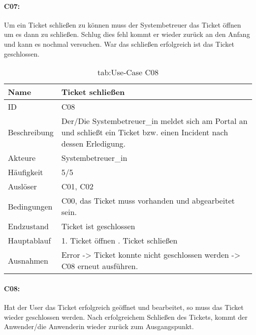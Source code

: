 \paragraph{C07:}
Um ein Ticket schließen zu können muss der Systembetreuer das Ticket öffnen um es dann zu schließen. Schlug dies fehl kommt er wieder zurück an den Anfang und kann es nochmal versuchen. War das schließen erfolgreich ist das Ticket geschlossen.

\newpage
\begin{table}[h]
	\begin{tabular}{|p{3cm}|p{10.7cm}|}
		\hline
		Name & Ticket schließen\\
		\hline
		ID &  C08\\
		\hline
		Beschreibung & Der/Die Systembetreuer\_in meldet sich am Portal an und schließt ein Ticket bzw. einen Incident nach dessen Erledigung.\\
		\hline
		Akteure & Systembetreuer\_in\\
		\hline
		Häufigkeit & 5/5\\
		\hline
		Auslöser & C01, C02\\
		\hline
		Bedingungen & C00, das Ticket muss vorhanden und abgearbeitet sein.\\
		\hline
		Endzustand & Ticket ist geschlossen\\
		\hline
		Hauptablauf & 1. Ticket öffnen \newline2. Ticket schließen\\
		\hline
		Ausnahmen & Error -> Ticket konnte nicht geschlossen werden -> C08 erneut ausführen.\\
		\hline
	\end{tabular}
	\caption{tab:Use-Case C08}
\end{table}
\label{tab:tab:Use-Case C08}

\paragraph{C08:}
Hat der User das Ticket erfolgreich geöffnet und bearbeitet, so muss das Ticket wieder geschlossen werden. Nach erfolgreichem Schließen des Tickets, kommt der Anwender/die Anwenderin wieder zurück zum Ausgangspunkt.


\renewcommand{\arraystretch}{1}